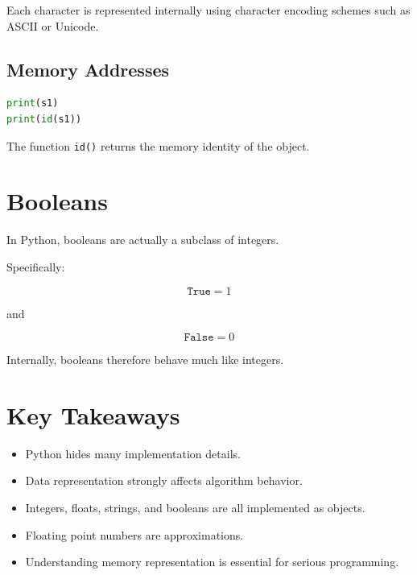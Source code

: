 \documentclass[11pt]{article}
\begin{document}
Each character is represented internally using character encoding schemes such as ASCII or Unicode.

\subsection{Memory Addresses}

\begin{lstlisting}[language=Python]
print(s1)
print(id(s1))
\end{lstlisting}

The function \texttt{id()} returns the memory identity of the object.

\section{Booleans}

In Python, booleans are actually a subclass of integers.

Specifically:

\[
\texttt{True} = 1
\]

and

\[
\texttt{False} = 0
\]

Internally, booleans therefore behave much like integers.

\section{Key Takeaways}

\begin{itemize}
    \item Python hides many implementation details.
    \item Data representation strongly affects algorithm behavior.
    \item Integers, floats, strings, and booleans are all implemented as objects.
    \item Floating point numbers are approximations.
    \item Understanding memory representation is essential for serious programming.
\end{itemize}
\end{document}
